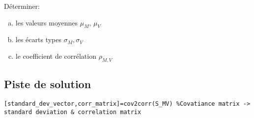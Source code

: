 \documentclass[letterpaper]{article}
\begin{document}
\noindent Déterminer: 
\begin{enumerate}[a)]
\item les valeurs moyennes $\mu_{M},\,\mu_{V}$
\item les écarts types $\sigma_{M},\sigma_{V}$
\item le coefficient de corrélation $\rho_{M,V}$
\end{enumerate}

\subsection*{Piste de solution}

\begin{lstlisting}[style=Matlab-editor]
[standard_dev_vector,corr_matrix]=cov2corr(S_MV) %Covatiance matrix -> standard deviation & correlation matrix
\end{lstlisting}

%
 
\end{document}
